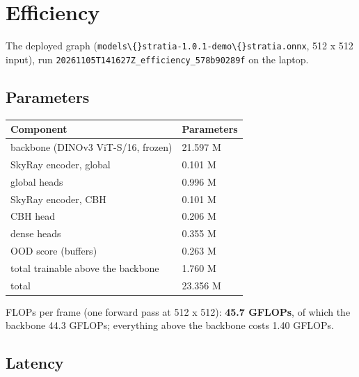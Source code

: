 \section{Efficiency}

The deployed graph (\texttt{models\textbackslash\{\}stratia-1.0.1-demo\textbackslash\{\}stratia.onnx}, 512 x 512 input), run \texttt{20261105T141627Z\_\allowbreak{}efficiency\_\allowbreak{}578b90289f} on the laptop.

\subsection{Parameters}

\begin{center}{\scriptsize\setlength{\tabcolsep}{3pt}
\begin{tabular}{p{15.6cm}l}
\toprule
Component & Parameters \\
\midrule
backbone (DINOv3 ViT-S/16, frozen) & 21.597 M \\
SkyRay encoder, global & 0.101 M \\
global heads & 0.996 M \\
SkyRay encoder, CBH & 0.101 M \\
CBH head & 0.206 M \\
dense heads & 0.355 M \\
OOD score (buffers) & 0.263 M \\
total trainable above the backbone & 1.760 M \\
total & 23.356 M \\
\bottomrule
\end{tabular}}
\end{center}

FLOPs per frame (one forward pass at 512 x 512): \textbf{45.7 GFLOPs}, of which the backbone 44.3 GFLOPs; everything above the backbone costs 1.40 GFLOPs.

\subsection{Latency}


